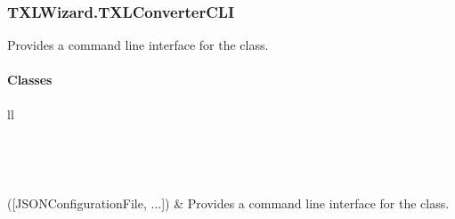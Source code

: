 \documentclass[letterpaper,10pt,english]{sphinxmanual}
\begin{document}
\subsubsection{TXLWizard.TXLConverterCLI}
\label{Chapters/PythonModuleReference/TXLConverter/TXLWizard.TXLConverterCLI::doc}\label{Chapters/PythonModuleReference/TXLConverter/TXLWizard.TXLConverterCLI:txlwizard-txlconvertercli}\label{Chapters/PythonModuleReference/TXLConverter/TXLWizard.TXLConverterCLI:module-TXLWizard.TXLConverterCLI}
Provides a command line interface for the {\hyperref[Chapters/PythonModuleReference/TXLConverter/TXLWizard.TXLConverter:TXLWizard.TXLConverter.TXLConverter]{}} class.


\paragraph{Classes}
\label{Chapters/PythonModuleReference/TXLConverter/TXLWizard.TXLConverterCLI:classes}
\begin{longtable}{ll}
\hline
\endfirsthead

%
{{}} \\
\hline
\endhead

\hline {} \\ \hline
\endfoot

\endlastfoot


{\hyperref[Chapters/PythonModuleReference/TXLConverter/TXLWizard.TXLConverterCLI:TXLWizard.TXLConverterCLI.TXLConverterCLI]{}}({[}JSONConfigurationFile, ...{]})
 & 
Provides a command line interface for the {\hyperref[Chapters/PythonModuleReference/TXLConverter/TXLWizard.TXLConverter:TXLWizard.TXLConverter.TXLConverter]{}} class.
\\
\hline\end{longtable}

\end{document}
